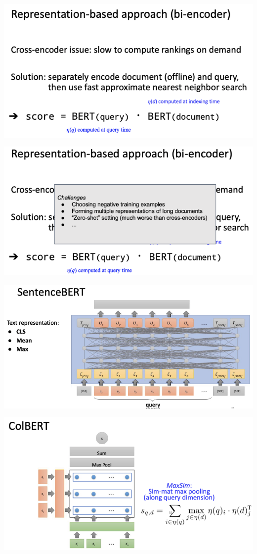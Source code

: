 \begin{minipage}{0.5\textwidth}
\includegraphics[scale=0.5]{figures/repr5.png}
\end{minipage}
\begin{minipage}{0.5\textwidth}
\includegraphics[scale=0.5]{figures/repr6.png}
\end{minipage}

\vspace{1cm}

\begin{minipage}{0.5\textwidth}
\includegraphics[scale=0.5]{figures/repr7.png}
\end{minipage}
\begin{minipage}{0.5\textwidth}
\includegraphics[scale=0.5]{figures/repr8.png}
\end{minipage}